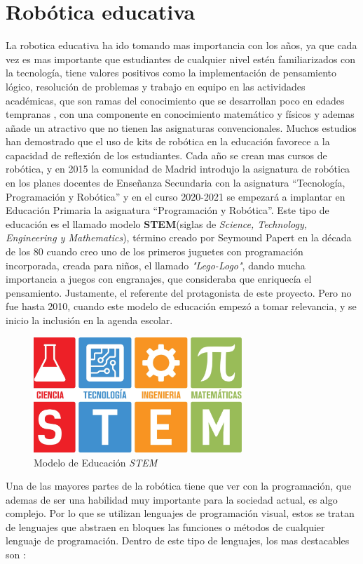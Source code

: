 \section{Robótica educativa}
\label{sec:educativa}
La robotica educativa ha ido tomando mas importancia con los años, ya que cada vez es mas importante que estudiantes de cualquier nivel estén familiarizados con la tecnología, tiene valores positivos como la implementación de pensamiento lógico, resolución de problemas y trabajo en equipo en las actividades académicas, que son ramas del conocimiento que se desarrollan poco en edades tempranas , con una componente en conocimiento matemático y físicos y ademas añade un atractivo que no tienen las asignaturas convencionales.
Muchos estudios han demostrado que el uso de kits de robótica en la educación favorece a la capacidad de reflexión de los estudiantes.
Cada año se crean mas cursos de robótica, y en 2015 la comunidad de Madrid introdujo la asignatura de robótica en los planes docentes de Enseñanza Secundaria con la asignatura ``Tecnología, Programación y Robótica''\cite{bib:secundaria} y en el curso 2020-2021 se empezará a implantar en Educación Primaria la asignatura ``Programación y Robótica''\cite{bib:primaria}.\newline
Este tipo de educación es el llamado modelo \textbf{STEM}(siglas de \textit{Science, Technology, Engineering y Mathematics}), término creado por Seymound Papert en la década de los 80 cuando creo uno de los primeros juguetes con programación incorporada, creada para niños, el llamado \textit{"Lego-Logo"}, dando mucha importancia a juegos con engranajes, que consideraba que enriquecía el pensamiento. Justamente, el referente del protagonista de este proyecto.\newline
Pero no fue hasta 2010, cuando este modelo de educación empezó a tomar relevancia, y se inicio la inclusión en la agenda escolar.
        \begin{figure}[H]
    \centering
    \includegraphics[width=0.7\textwidth]{img/stem.jpg}
    \caption{Modelo de Educación \textit{STEM}} \label{fig:stem}
    \end{figure}
Una de las mayores partes de la robótica tiene que ver con la programación, que ademas de ser una habilidad muy importante para la sociedad actual, es algo complejo. Por lo que se utilizan lenguajes de programación visual, estos se tratan de lenguajes que abstraen en bloques las funciones o métodos de cualquier lenguaje de programación. Dentro de este tipo de lenguajes, los mas destacables son :

